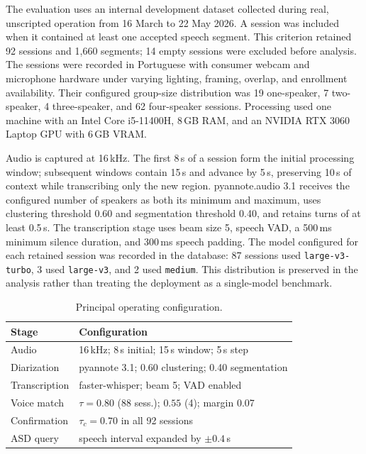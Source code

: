 \documentclass[conference]{IEEEtran}
\begin{document}
The evaluation uses an internal development dataset collected during
real, unscripted operation from 16 March to 22 May 2026. A session was
included when it contained at least one accepted speech segment. This
criterion retained 92 sessions and 1{,}660 segments; 14 empty sessions
were excluded before analysis. The sessions were recorded in
Portuguese with consumer webcam and microphone hardware under varying
lighting, framing, overlap, and enrollment availability. Their
configured group-size distribution was 19 one-speaker, 7 two-speaker,
4 three-speaker, and 62 four-speaker sessions. Processing used one
machine with an Intel Core i5-11400H, 8\,GB RAM, and an NVIDIA RTX 3060
Laptop GPU with 6\,GB VRAM.

Audio is captured at 16\,kHz. The first 8\,s of a session form the
initial processing window; subsequent windows contain 15\,s and advance
by 5\,s, preserving 10\,s of context while transcribing only the new
region. pyannote.audio 3.1 receives the configured number of speakers as
both its minimum and maximum, uses clustering threshold 0.60 and
segmentation threshold 0.40, and retains turns of at least 0.5\,s. The
transcription stage uses beam size 5, speech VAD, a 500\,ms minimum
silence duration, and 300\,ms speech padding. The model configured for
each retained session was recorded in the database: 87 sessions used
\texttt{large-v3-turbo}, 3 used \texttt{large-v3}, and 2 used
\texttt{medium}. This distribution is preserved in the analysis rather
than treating the deployment as a single-model benchmark.

\begin{table}[h]
\caption{Principal operating configuration.}
\begin{center}
\footnotesize
\begin{tabular}{ll}
\hline
\textbf{Stage} & \textbf{Configuration} \\
\hline
Audio & 16\,kHz; 8\,s initial; 15\,s window; 5\,s step \\
Diarization & pyannote 3.1; 0.60 clustering; 0.40 segmentation \\
Transcription & faster-whisper; beam 5; VAD enabled \\
Voice match & $\tau=0.80$ (88 sess.); $0.55$ (4); margin 0.07 \\
Confirmation & $\tau_c=0.70$ in all 92 sessions \\
ASD query & speech interval expanded by $\pm0.4$\,s \\
\hline
\end{tabular}
\label{tab:configuration}
\end{center}
\end{table}
\end{document}
